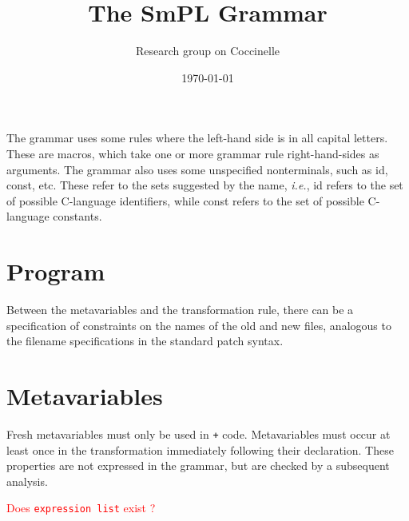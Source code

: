 \documentclass{article}
\title{The SmPL Grammar}
\author{Research group on Coccinelle}
\date{\today}
\newcommand{\mtt}[1]{\mbox{\tt{{#1}}}}
\newcommand{\fixme}[1]{{\textcolor{red}{#1}}}
\begin{document}
\maketitle



The grammar uses some rules where the left-hand side is in all capital
letters.  These are macros, which take one or more grammar rule
right-hand-sides as arguments.  The grammar also uses some unspecified
nonterminals, such as {\sf id}, {\sf const}, etc.  These refer to the sets
suggested by the name, {\em i.e.}, {\sf id} refers to the set of possible
C-language identifiers, while {\sf const} refers to the set of possible
C-language constants.

\section{Program}

\begin{grammar}
  
\end{grammar}

Between the metavariables and the transformation rule, there can be a
specification of constraints on the names of the old and new files,
analogous to the filename specifications in the standard patch syntax.

\section{Metavariables}

Fresh metavariables must only be used in {\tt +} code.  Metavariables must
occur at least once in the transformation immediately following their
declaration.  These properties are not expressed in the grammar, but are
checked by a subsequent analysis.

\fixme{Does \mtt{expression list} exist ?}
\end{document}
